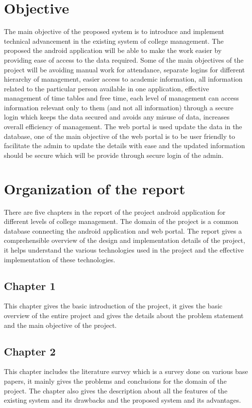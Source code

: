 \documentclass[BTech]{srmuthesis}
\begin{document}
\section{Objective}
The main objective of the proposed system is to introduce and implement technical advancement in the existing system of college management. The proposed the android application will be able to make the work easier by providing ease of access to the data required. Some of the main objectives of the project will be avoiding manual work for attendance, separate logins for different hierarchy of management, easier access to academic information, all information related to the particular person available in one application, effective management of time tables and free time, each level of management can access information relevant only to them (and not all information) through a secure login which keeps the data secured and avoids any misuse of data, increases overall efficiency of management. The web portal is used update the data in the database, one of the main objective of the web portal is to be user friendly to facilitate the admin to update the details with ease and the updated information should be secure which will be provide through secure login of the admin.
\section{Organization of the report}
There are five chapters in the report of the project android application for different levels of college management. The domain of the project is a common database connecting the android application and web portal. The report gives a comprehensible overview of the design and implementation details of the project, it helps understand the various technologies used in the project and the effective implementation of these technologies.
 
\subsection*{Chapter 1}
This chapter gives the basic introduction of the project, it gives the basic overview of the entire project and gives the details about the problem statement and the main objective of the project.

\subsection*{Chapter 2}
This chapter includes the literature survey which is a survey done on various base papers, it mainly gives the problems and conclusions for the domain of the project. The chapter also gives the description about  all the features of the existing system and its drawbacks and the proposed system and its advantages.
\end{document}
